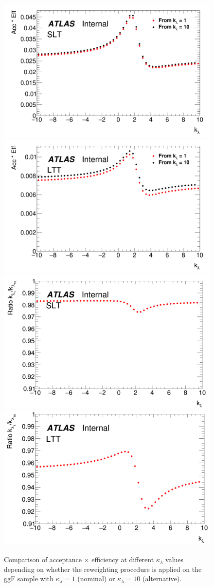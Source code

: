 \begin{figure}[!htb]
    \begin{center}
        \includegraphics[width=.45\textwidth]{DiHiggs/plots/kl_SLT acc.png}
        \includegraphics[width=.45\textwidth]{DiHiggs/plots/kl_LTT acc.png} \\
        \includegraphics[width=.45\textwidth]{DiHiggs/plots/kl_scan/bbtautauSubchannels/bbtautau_kl_accxeff_slt.png}
        \includegraphics[width=.45\textwidth]{DiHiggs/plots/kl_scan/bbtautauSubchannels/bbtautau_kl_accxeff_ltt.png}
    \end{center}
    \caption{Comparison of acceptance $\times$ efficiency at different $\kappa_\lambda$ values depending on whether the 
    reweighting procedure is applied on the ggF sample with $\kappa_\lambda = 1$ (nominal) 
    or $\kappa_\lambda = 10$ (alternative).}
    \label{fig:bbtautau_accxeff}
\end{figure}

